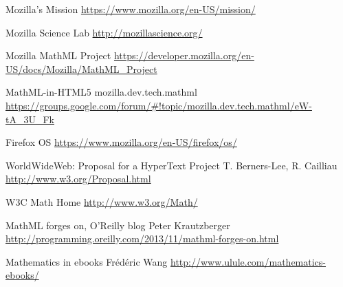 \begin{thebibliography}{7}

Mozilla's Mission
\href{https://www.mozilla.org/en-US/mission/}{https://www.mozilla.org/en-US/mission/}

Mozilla Science Lab
\href{http://mozillascience.org/}{http://mozillascience.org/}

Mozilla MathML Project
\href{https://developer.mozilla.org/en-US/docs/Mozilla/MathML_Project}{https://developer.mozilla.org/en-US/docs/Mozilla/MathML\_Project}

MathML-in-HTML5
mozilla.dev.tech.mathml
\href{https://groups.google.com/forum/#!topic/mozilla.dev.tech.mathml/eW-tA_3U_Fk}{https://groups.google.com/forum/\#!topic/mozilla.dev.tech.mathml/eW-tA\_3U\_Fk}

Firefox OS
\href{https://www.mozilla.org/en-US/firefox/os/}{https://www.mozilla.org/en-US/firefox/os/}

WorldWideWeb: Proposal for a HyperText Project
T. Berners-Lee, R. Cailliau
\href{http://www.w3.org/Proposal.html}{http://www.w3.org/Proposal.html}

W3C Math Home
\href{http://www.w3.org/Math/}{http://www.w3.org/Math/}

MathML forges on, O'Reilly blog
Peter Krautzberger
\href{http://programming.oreilly.com/2013/11/mathml-forges-on.html}{http://programming.oreilly.com/2013/11/mathml-forges-on.html}

Mathematics in ebooks
Frédéric Wang
\href{http://www.ulule.com/mathematics-ebooks/}{http://www.ulule.com/mathematics-ebooks/}

\end{thebibliography}
